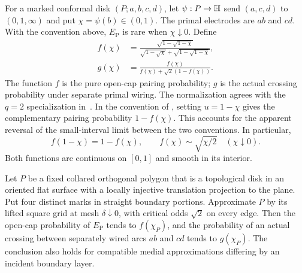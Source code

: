 For a marked conformal disk $(P;a,b,c,d)$, let $\psi:P\to\mathbb H$ send
$(a,c,d)$ to $(0,1,\infty)$ and put $\chi=\psi(b)\in(0,1)$.
The primal electrodes are $ab$ and $cd$. With the convention above,
$E_{\mathrm P}$ is rare when $\chi\downarrow0$. Define
\begin{equation}\label{eq:four-point-functions}
 \begin{split}
 f(\chi)&=
 \frac{\sqrt{1-\sqrt{1-\chi}}}
 {\sqrt{1-\sqrt\chi}+\sqrt{1-\sqrt{1-\chi}}},\\
 g(\chi)&=\frac{f(\chi)}{f(\chi)+\sqrt2(1-f(\chi))}.
 \end{split}
\end{equation}
The function $f$ is the pure open-cap pairing probability; $g$ is the
actual crossing probability under separate primal wiring. The
normalization agrees with the $q=2$ specialization in~\cite[Proposition
``Jordan-quad transfer'']{C}. In the convention of
\cite[Equation~(1.1)]{CS}, setting $u=1-\chi$ gives the complementary
pairing probability $1-f(\chi)$. This accounts for the apparent reversal
of the small-interval limit between the two conventions. In particular,
\begin{equation}\label{eq:four-point-properties}
 f(1-\chi)=1-f(\chi),\qquad
 f(\chi)\sim\sqrt{\chi/2}\quad(\chi\downarrow0).
\end{equation}
Both functions are continuous on $[0,1]$ and smooth in its interior.

\begin{proposition}\label{prop:pure-four-mark}
Let $P$ be a fixed collared orthogonal polygon that is a topological disk
in an oriented flat surface with a locally injective translation projection
to the plane. Put four distinct marks in straight boundary portions.
Approximate $P$ by its lifted square grid at mesh $\delta\downarrow0$,
with critical odds $\sqrt2$ on every edge. Then the open-cap probability
of $E_{\mathrm P}$ tends to $f(\chi_P)$, and the probability of an actual
crossing between separately wired arcs $ab$ and $cd$ tends to $g(\chi_P)$.
The conclusion also holds for compatible medial approximations differing
by an incident boundary layer.
\end{proposition}

